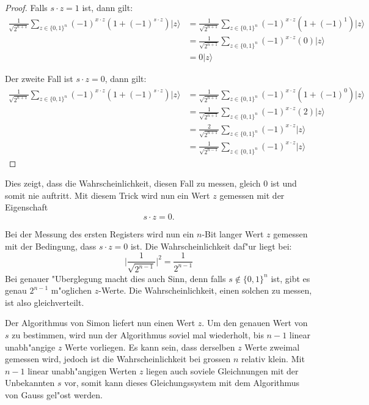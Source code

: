 \begin{refsection}
\begin{proof}
Falls $s \cdot z = 1$ ist, dann gilt:
\begin{align*}
    \frac1{\sqrt{2^{n + 1}}}
      \sum_{z \in \{0,1\}^n}  { (-1)^{x \cdot z} ( 1 + (-1)^{ s \cdot z}) |z\rangle } 
    &= 
    \frac1{\sqrt{2^{n + 1}}}
      \sum_{z \in \{0,1\}^n}  { (-1)^{x \cdot z} ( 1 + (-1)^1) |z\rangle } 
    \\
    &= 
    \frac1{\sqrt{2^{n + 1}}}
      \sum_{z \in \{0,1\}^n}  { (-1)^{x \cdot z} (0) |z\rangle } 
    \\
    &=
    0 |z\rangle
\end{align*}

Der zweite Fall ist $s \cdot z = 0$, dann gilt:
\begin{align*}
    \frac1{\sqrt{2^{n + 1}}}
      \sum_{z \in \{0,1\}^n}  { (-1)^{x \cdot z} ( 1 + (-1)^{ s \cdot z}) |z\rangle } 
    &= 
    \frac1{\sqrt{2^{n + 1}}}
      \sum_{z \in \{0,1\}^n}  { (-1)^{x \cdot z} ( 1 + (-1)^0) |z\rangle } 
    \\
    &= 
    \frac1{\sqrt{2^{n + 1}}}
      \sum_{z \in \{0,1\}^n}  { (-1)^{x \cdot z} (2) |z\rangle } 
    \\
    &= 
    \frac{2}{\sqrt{2^{n + 1}}} 
      \sum_{z \in \{0,1\}^n}  { (-1)^{x \cdot z}|z\rangle } 
    \\
    &= 
    \frac1{\sqrt{2^{n - 1}}} 
      \sum_{z \in \{0,1\}^n}  { (-1)^{x \cdot z}|z\rangle } 
\end{align*}
\end{proof}
Dies zeigt, dass die Wahrscheinlichkeit, diesen Fall zu messen, gleich 0 ist und
somit nie auftritt. 
Mit diesem Trick wird nun ein Wert $z$ gemessen mit der Eigenschaft
\[
    s \cdot z = 0.
\]

Bei der Messung des ersten Registers wird nun ein $n$-Bit langer Wert $z$
gemessen mit der Bedingung, dass $s \cdot z = 0$ ist. Die Wahrscheinlichkeit
daf"ur liegt bei:
\[
    \biggl|\frac1{\sqrt{2^{n - 1}}}\biggr|^2 = \frac1{2^{n-1}} 
\]
Bei genauer "Uberglegung macht dies auch Sinn, denn falls $s \notin \{0,1\}^n$
ist, gibt es genau $2^{n-1}$ m"oglichen $z$-Werte. Die Wahrscheinlichkeit, einen
solchen zu messen, ist also gleichverteilt.

Der Algorithmus von Simon liefert nun einen Wert $z$. Um den genauen Wert von
$s$ zu bestimmen, wird nun der Algorithmus soviel mal wiederholt, bis $n-1$
linear unabh"angige $z$ Werte vorliegen. Es kann sein, dass derselben $z$ Werte
zweimal gemessen wird, jedoch ist die Wahrscheinlichkeit bei grossen $n$
relativ klein.  Mit $n-1$ linear unabh"angigen Werten $z$ liegen auch soviele
Gleichnungen mit der Unbekannten $s$ vor, somit kann dieses Gleichungssystem mit
dem Algorithmus von Gauss gel"ost werden.


\end{refsection}
